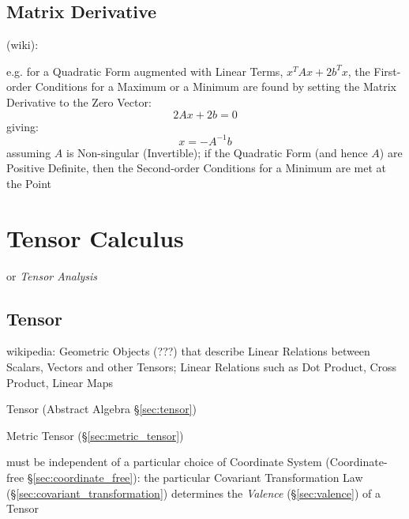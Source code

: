 \subsection{Matrix Derivative}\label{sec:matrix_derivative}

(wiki):

e.g. for a Quadratic Form augmented with Linear Terms, $x^TAx + 2b^Tx$, the
First-order Conditions for a Maximum or a Minimum are found by setting the
Matrix Derivative to the Zero Vector:
\[
  2Ax + 2b = 0
\]
giving:
\[
  x = -A^{-1}b
\]
assuming $A$ is Non-singular (Invertible); if the Quadratic Form (and hence
$A$) are Positive Definite, then the Second-order Conditions for a
Minimum are met at the Point



\section{Tensor Calculus}\label{sec:tensor_calculus}

or \emph{Tensor Analysis}



\subsection{Tensor}\label{sec:linear_tensor}

wikipedia: Geometric Objects (???) that describe Linear Relations
between Scalars, Vectors and other Tensors; Linear Relations such as
Dot Product, Cross Product, Linear Maps


\fist Tensor (Abstract Algebra \S\ref{sec:tensor})

\fist Metric Tensor (\S\ref{sec:metric_tensor})

must be independent of a particular choice of Coordinate System
(Coordinate-free \S\ref{sec:coordinate_free}): the particular Covariant
Transformation Law (\S\ref{sec:covariant_transformation}) determines
the \emph{Valence} (\S\ref{sec:valence}) of a Tensor

